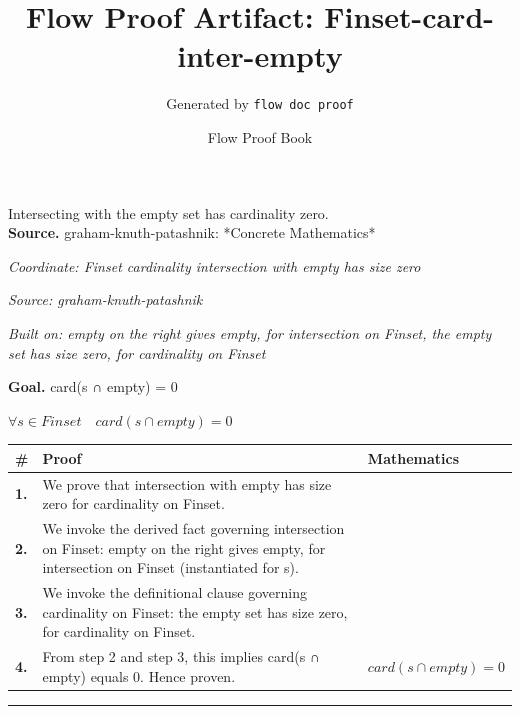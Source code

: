 \documentclass[11pt]{article}
\title{Flow Proof Artifact: Finset-card-inter-empty}
\author{Generated by \texttt{flow doc proof}}
\date{Flow Proof Book}
\theoremstyle{definition}
\begin{document}
\maketitle
Intersecting with the empty set has cardinality zero.\\[0.5em]
\textbf{Source.} graham-knuth-patashnik: *Concrete Mathematics*\\[0.5em]
\bigskip
{}\par
\smallskip\noindent\textit{Coordinate: Finset \cdot cardinality \cdot intersection with empty has size zero}\par
\smallskip\noindent\textit{Source: graham-knuth-patashnik}\par
\smallskip\noindent\textit{Built on: empty on the right gives empty, for intersection on Finset, the empty set has size zero, for cardinality on Finset}\par
\medskip
\noindent\textbf{Goal.} card(s ∩ empty) = 0\par
\noindent$\displaystyle \forall s \in Finset\quad card(s ∩ empty) = 0$\par
\medskip
\noindent
\begin{tabular}{@{} >{\raggedright\arraybackslash}p{} >{\raggedright\arraybackslash}p{} >{\raggedleft\arraybackslash}p{} @{}}
\textbf{\#} & \textbf{Proof} & \textbf{Mathematics} \\
\midrule
\textbf{1.} & We prove that intersection with empty has size zero for cardinality on Finset. & \\[0.45em]
\textbf{2.} & We invoke the derived fact governing intersection on Finset: empty on the right gives empty, for intersection on Finset (instantiated for s). & \\[0.45em]
\textbf{3.} & We invoke the definitional clause governing cardinality on Finset: the empty set has size zero, for cardinality on Finset. & \\[0.45em]
\textbf{4.} & From step 2 and step 3, this implies card(s ∩ empty) equals 0. Hence proven. & $\displaystyle card(s ∩ empty) = 0$ \\[0.45em]
\bottomrule
\end{tabular}
\label{thm:Finset-cardinality-intersection_with_empty_has_size_zero}
\par\medskip\hrule
\end{document}

